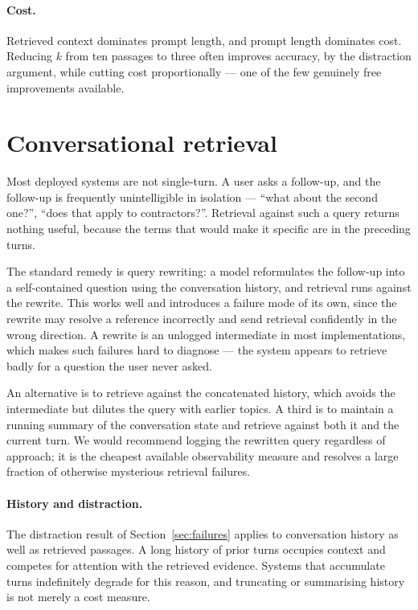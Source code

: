 \documentclass[11pt,a4paper]{article}
\begin{document}
\paragraph{Cost.}
Retrieved context dominates prompt length, and prompt length dominates cost.
Reducing $k$ from ten passages to three often improves accuracy, by the
distraction argument, while cutting cost proportionally --- one of the few
genuinely free improvements available.

\section{Conversational retrieval}
\label{sec:conversational}

Most deployed systems are not single-turn. A user asks a follow-up, and the
follow-up is frequently unintelligible in isolation --- ``what about the
second one?'', ``does that apply to contractors?''. Retrieval against such a
query returns nothing useful, because the terms that would make it specific
are in the preceding turns.

The standard remedy is query rewriting: a model reformulates the follow-up
into a self-contained question using the conversation history, and retrieval
runs against the rewrite. This works well and introduces a failure mode of its
own, since the rewrite may resolve a reference incorrectly and send retrieval
confidently in the wrong direction. A rewrite is an unlogged intermediate in
most implementations, which makes such failures hard to diagnose --- the
system appears to retrieve badly for a question the user never asked.

An alternative is to retrieve against the concatenated history, which avoids
the intermediate but dilutes the query with earlier topics. A third is to
maintain a running summary of the conversation state and retrieve against
both it and the current turn. We would recommend logging the rewritten query
regardless of approach; it is the cheapest available observability measure and
resolves a large fraction of otherwise mysterious retrieval failures.

\paragraph{History and distraction.}
The distraction result of Section~\ref{sec:failures} applies to conversation
history as well as retrieved passages. A long history of prior turns occupies
context and competes for attention with the retrieved evidence. Systems that
accumulate turns indefinitely degrade for this reason, and truncating or
summarising history is not merely a cost measure.
\end{document}
